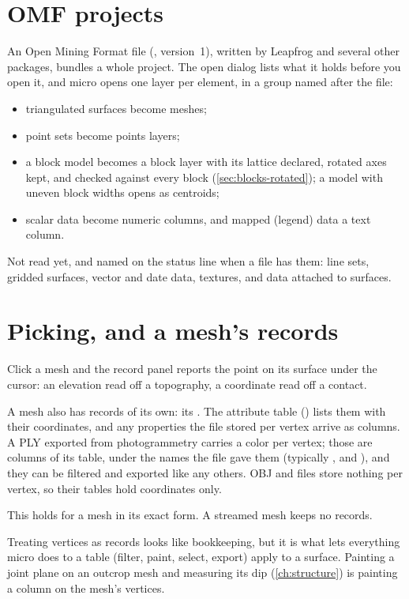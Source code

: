 \section{OMF projects}\label{sec:meshes-omf}

An Open Mining Format file (, version~1), written by Leapfrog and several other packages, bundles a whole project. The open dialog lists what it holds before you open it, and micro opens one layer per element, in a group named after the file:

\begin{itemize}
\item triangulated surfaces become meshes;
\item point sets become points layers;
\item a block model becomes a block layer with its lattice declared, rotated axes kept, and checked against every block (\cref{sec:blocks-rotated}); a model with uneven block widths opens as centroids;
\item scalar data become numeric columns, and mapped (legend) data a text column.
\end{itemize}

Not read yet, and named on the status line when a file has them: line sets, gridded surfaces, vector and date data, textures, and data attached to surfaces.

\section{Picking, and a mesh's records}\label{sec:meshes-records}

Click a mesh and the record panel reports the point on its surface under the cursor: an elevation read off a topography, a coordinate read off a contact.

A mesh also has records of its own: its . The attribute table () lists them with their coordinates, and any properties the file stored per vertex arrive as columns. A PLY exported from photogrammetry carries a color per vertex; those are columns of its table, under the names the file gave them (typically ,  and ), and they can be filtered and exported like any others. OBJ and  files store nothing per vertex, so their tables hold coordinates only.

This holds for a mesh in its exact form. A streamed mesh keeps no records.

\begin{why}
Treating vertices as records looks like bookkeeping, but it is what lets everything micro does to a table (filter, paint, select, export) apply to a surface. Painting a joint plane on an outcrop mesh and measuring its dip (\cref{ch:structure}) is painting a column on the mesh's vertices.
\end{why}

